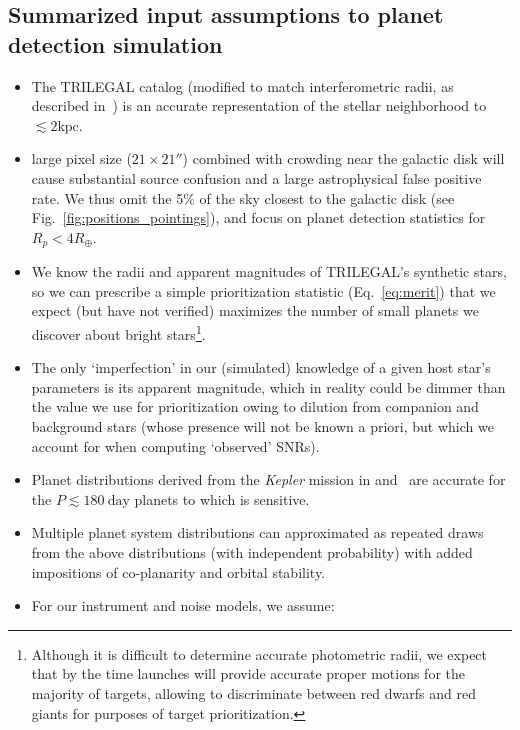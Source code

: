 \subsection{Summarized input assumptions to planet detection simulation}
\label{sec:input_assumptions}
\begin{itemize}
	\item The TRILEGAL catalog (modified to match interferometric radii, as described in~) is an accurate representation of the stellar neighborhood to $\lesssim2\text{kpc}$.
	\item \tesss large pixel size ($21\times21''$) combined with crowding near the galactic disk will cause substantial source confusion and a large astrophysical false positive rate. We thus omit the 5\% of the sky closest to the galactic disk (see Fig.~\ref{fig:positions_pointings}), and focus on planet detection statistics for $R_p < 4R_\oplus$.
	\item We know the radii and apparent magnitudes of TRILEGAL's synthetic stars, so we can prescribe a simple prioritization statistic (Eq.~\ref{eq:merit}) that we expect (but have not verified) maximizes the number of small planets we discover about bright stars\footnote{Although it is difficult to determine accurate photometric radii, we expect that by the time \tess launches \gaia will  provide accurate proper motions for the majority of \tess targets, allowing \tess to discriminate between red dwarfs and red giants for purposes of target prioritization.}.
	\item The only `imperfection' in our (simulated) knowledge of a given host star's parameters is its apparent magnitude, which in reality could be dimmer than the value we use for prioritization owing to dilution from companion and background stars (whose presence will not be known a priori, but which we account for when computing `observed' SNRs).
	\item Planet distributions derived from the \textit{Kepler} mission in \citet{fressin_false_2013} and~\citet{dressing_occurrence_2015} are accurate for the $P \lesssim 180\ \text{day}$ planets to which \tess is sensitive.
	\item Multiple planet system distributions can approximated as repeated draws from the above distributions (with independent probability) with added impositions of co-planarity and orbital stability.
	\item For our instrument and noise models, we assume:

\end{itemize}
